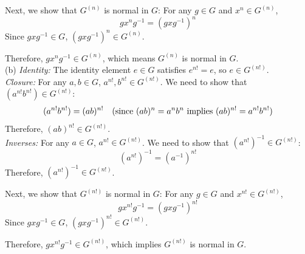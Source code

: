 Next, we show that \( G^{(n)} \) is normal in \( G \):
For any \( g \in G \) and \( x^n \in G^{(n)} \),
\[
g x^n g^{-1} = (gxg^{-1})^n
\]
Since \( gxg^{-1} \in G \), \( (gxg^{-1})^n \in G^{(n)} \).

Therefore, \( g x^n g^{-1} \in G^{(n)} \), which means \( G^{(n)} \) is normal in \( G \).
\\
{(b)} \textit{Identity:} The identity element \( e \in G \) satisfies \( e^{n!} = e \), so \( e \in G^{(n!)} \).
\\
\textit{Closure:} For any \( a, b \in G \), \( a^{n!}, b^{n!} \in G^{(n!)} \). We need to show that \( (a^{n!} b^{n!}) \in G^{(n!)} \):
   \[
   (a^{n!} b^{n!}) = (ab)^{n!} \quad \text{(since \( (ab)^n = a^n b^n \) implies \( (ab)^{n!} = a^{n!} b^{n!} \))}
   \]
   Therefore, \( (ab)^{n!} \in G^{(n!)} \).
\\
\textit{Inverses:} For any \( a \in G \), \( a^{n!} \in G^{(n!)} \). We need to show that \( (a^{n!})^{-1} \in G^{(n!)} \):
   \[
   (a^{n!})^{-1} = (a^{-1})^{n!}
   \]
   Therefore, \( (a^{n!})^{-1} \in G^{(n!)} \).

Next, we show that \( G^{(n!)} \) is normal in \( G \):
For any \( g \in G \) and \( x^{n!} \in G^{(n!)} \),
\[
g x^{n!} g^{-1} = (gxg^{-1})^{n!}
\]
Since \( gxg^{-1} \in G \), \( (gxg^{-1})^{n!} \in G^{(n!)} \).

Therefore, \( g x^{n!} g^{-1} \in G^{(n!)} \), which implies \( G^{(n!)} \) is normal in \( G \).
